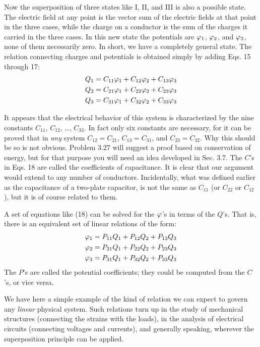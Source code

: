 Now the superposition of three states like I, II, and III is also a
possible state. The electric field at any point is the vector sum of
the electric fields at that point in the three cases, while the charge on
a conductor is the sum of the charges it carried in the three cases.
In this new state the potentials are $\varphi_1$, $\varphi_2$, and $\varphi_3$, none of them necessarily
zero. In short, we have a completely general state. The
relation connecting charges and potentials is obtained simply by
adding Eqs. 15 through 17:
\begin{align}
\begin{split}
  Q_1 = C_{11}\varphi_1 + C_{12}\varphi_2 + C_{13}\varphi_3 \\
  Q_2 = C_{21}\varphi_1 + C_{22}\varphi_2 + C_{23}\varphi_3 \\
  Q_3 = C_{31}\varphi_1 + C_{32}\varphi_2 + C_{33}\varphi_3
\end{split}
\end{align}

It appears that the electrical behavior of this system is characterized
by the nine constants $C_{11}$, $C_{12}$, \ldots , $C_{33}$. In fact only six constants
are necessary, for it can be proved that in \emph{any} system
$C_{12} = C_{21}$, $C_{13} = C_{31}$, and $C_{23} = C_{32}$.  Why this should be so is not
obvious. Problem 3.27 will suggest a proof based on conservation
of energy, but for that purpose you will need an idea developed in
Sec. 3.7. The $C$'s in Eqs. 18 are called the coefficients of capacitance.
It is clear that our argument would extend to any number of conductors.
Incidentally, what was defined earlier as the capacitance
of a two-plate capacitor, is not the same as $C_{11}$ (or $C_{22}$ or $C_{12}$), but
it is of course related to them.

A set of equations like (18) can be solved for the $\varphi$'s in terms of
the $Q$'s. That is, there is an equivalent set of linear relations of the
form:
\begin{align}
\begin{split}
  \varphi_1 = P_{11}Q_1 + P_{12}Q_2 + P_{13}Q_3 \\
  \varphi_2 = P_{21}Q_1 + P_{22}Q_2 + P_{23}Q_3 \\
  \varphi_3 = P_{31}Q_1 + P_{32}Q_2 + P_{33}Q_3
\end{split}
\end{align}
The $P$'s are called the potential coefficients; they could be computed
from the $C$'s, or vice versa.

We have here a simple example of the kind of relation we can
expect to govern any \emph{linear} physical system. Such relations turn up
in the study of mechanical structures (connecting the strains with
the loads), in the analysis of electrical circuits (connecting voltages
and currents), and generally speaking, wherever the superposition
principle can be applied.

